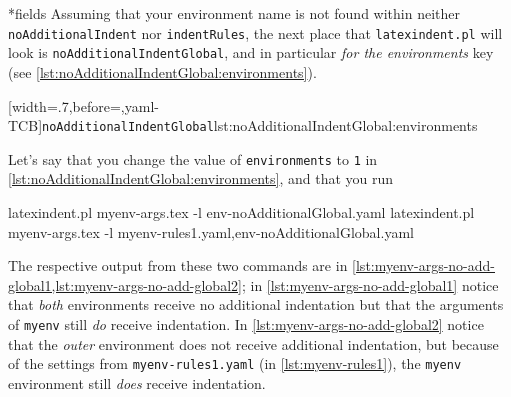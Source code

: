 *{fields}
 Assuming that your environment name is not found within neither
 \texttt{noAdditionalIndent} nor \texttt{indentRules}, the next place that
 \texttt{latexindent.pl} will look is \texttt{noAdditionalIndentGlobal}, and in
 particular \emph{for the environments} key (see
 \cref{lst:noAdditionalIndentGlobal:environments}).

 [width=.7\linewidth,before=\centering,yaml-TCB]{\texttt{noAdditionalIndentGlobal}}{lst:noAdditionalIndentGlobal:environments}

 \begin{example}
 Let's say that you change the value of \texttt{environments} to \texttt{1} in
 \cref{lst:noAdditionalIndentGlobal:environments}, and that you run 

 \begin{widepage}

  \begin{commandshell}
latexindent.pl myenv-args.tex -l env-noAdditionalGlobal.yaml
latexindent.pl myenv-args.tex -l myenv-rules1.yaml,env-noAdditionalGlobal.yaml
\end{commandshell}

 \end{widepage}

 The respective output from these two commands are in
 \cref{lst:myenv-args-no-add-global1,lst:myenv-args-no-add-global2}; in
 \cref{lst:myenv-args-no-add-global1} notice that \emph{both} environments receive no
 additional indentation but that the arguments of \texttt{myenv} still \emph{do} receive
 indentation. In \cref{lst:myenv-args-no-add-global2} notice that the \emph{outer}
 environment does not receive additional indentation, but because of the settings from
 \texttt{myenv-rules1.yaml} (in \vref{lst:myenv-rules1}), the \texttt{myenv} environment
 still \emph{does} receive indentation.

 \begin{cmhtcbraster}
 \end{cmhtcbraster}
 \end{example}

